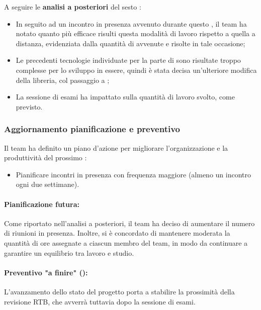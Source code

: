 \vspace{0.5\baselineskip}
\par A seguire le \textbf{analisi a posteriori} del sesto :
\begin{itemize}
  \item In seguito ad un incontro in presenza avvenuto durante questo , il team ha notato quanto più efficace risulti questa modalità di lavoro rispetto a quella a distanza, evidenziata dalla quantità di  avvenute e risolte in tale occasione;
  \item Le precedenti tecnologie individuate per la parte di  sono risultate troppo complesse per lo sviluppo in essere, quindi è stata decisa un'ulteriore modifica della libreria, col passaggio a ;
  \item La sessione di esami ha impattato sulla quantità di lavoro svolto, come previsto.
\end{itemize}

\subsubsection{Aggiornamento pianificazione e preventivo}
\par Il team ha definito un piano d'azione per migliorare l'organizzazione e la produttività del prossimo :
\begin{itemize}
  \item Pianificare incontri in presenza con frequenza maggiore (almeno un incontro ogni due settimane).
\end{itemize}

\paragraph*{Pianificazione futura:}
\par Come riportato nell'analisi a posteriori, il team ha deciso di aumentare il numero di riunioni in presenza.
Inoltre, si è concordato di mantenere moderata la quantità di ore assegnate a ciascun membro del team, in modo da continuare a garantire un equilibrio tra lavoro e studio.

\paragraph*{Preventivo "a finire" ():}
\par L'avanzamento dello stato del progetto porta a stabilire la prossimità della revisione RTB, che avverrà tuttavia dopo la sessione di esami.

